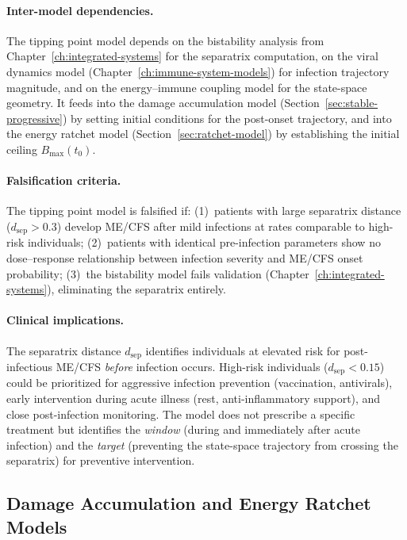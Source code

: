 \paragraph{Inter-model dependencies.}
The tipping point model depends on the bistability analysis from Chapter~\ref{ch:integrated-systems} for the separatrix computation, on the viral dynamics model (Chapter~\ref{ch:immune-system-models}) for infection trajectory magnitude, and on the energy--immune coupling model for the state-space geometry. It feeds into the damage accumulation model (Section~\ref{sec:stable-progressive}) by setting initial conditions for the post-onset trajectory, and into the energy ratchet model (Section~\ref{sec:ratchet-model}) by establishing the initial ceiling $B_{\max}(t_0)$.

\paragraph{Falsification criteria.}
The tipping point model is falsified if: (1)~patients with large separatrix distance ($d_{\text{sep}} > 0.3$) develop ME/CFS after mild infections at rates comparable to high-risk individuals; (2)~patients with identical pre-infection parameters show no dose--response relationship between infection severity and ME/CFS onset probability; (3)~the bistability model fails validation (Chapter~\ref{ch:integrated-systems}), eliminating the separatrix entirely.

\paragraph{Clinical implications.}
The separatrix distance $d_{\text{sep}}$ identifies individuals at elevated risk for post-infectious ME/CFS \emph{before} infection occurs. High-risk individuals ($d_{\text{sep}} < 0.15$) could be prioritized for aggressive infection prevention (vaccination, antivirals), early intervention during acute illness (rest, anti-inflammatory support), and close post-infection monitoring. The model does not prescribe a specific treatment but identifies the \emph{window} (during and immediately after acute infection) and the \emph{target} (preventing the state-space trajectory from crossing the separatrix) for preventive intervention.

\subsection{Damage Accumulation and Energy Ratchet Models}

